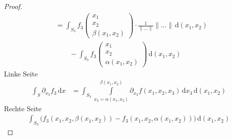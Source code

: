 \begin{theorem}
\begin{proof}
\begin{align*}
      &= \int_{S_3} f_3 \begin{pmatrix} x_1 \\ x_2 \\ \beta(x_1,x_2) \end{pmatrix} \cdot \frac{1}{\|\ldots\|} \|\ldots\| \, \mathrm{d}(x_1,x_2) \\
      &\qquad - \int_{S_3} f_3 \begin{pmatrix} x_1 \\ x_2 \\ \alpha(x_1,x_2) \end{pmatrix} \, \mathrm{d}(x_1,x_2)
    \end{align*}
    Linke Seite
    \begin{align*}
      \int_S \partial_{x_3} f_3 \, \mathrm{d}x
      &= \int_{S_3} \int\limits_{x_3 = \alpha(x_1,x_2)}^{\beta(x_1,x_2)} \partial_{x_3} f(x_1,x_2,x_3) \, \mathrm{d}x_3 \, \mathrm{d}(x_1,x_2)
    \end{align*}
    Rechte Seite
    \begin{align*}
      \int_{S_3} \Big( f_3(x_1,x_2,\beta(x_1,x_2)) - f_3(x_1,x_2,\alpha(x_1,x_2)) \Big) \, \mathrm{d}(x_1,x_2)
    \end{align*}
  \end{proof}
\end{theorem}

